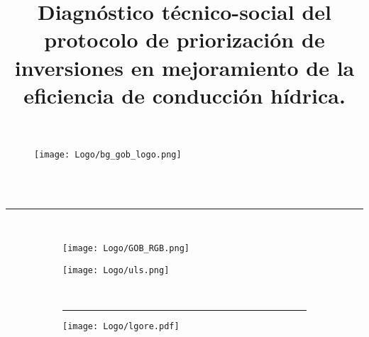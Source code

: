 \documentclass[]{article}
\title{Diagnóstico técnico-social del protocolo de priorización de inversiones en mejoramiento de la eficiencia de conducción hídrica.}
\author{}
\date{}
\begin{document}
\sloppy 


\begin{titlepage}

\begin{figure} [H]
  \texttt{[image: Logo/bg\_gob\_logo.png]}
\end{figure}

\fontsize{15}{0} \selectfont{\textbf{\textcolor{casinegro}{``PLANIFICACIÓN DE LA INVERSIÓN EN REVESTIMIENTOS HÍDRICOS"}}} \vspace*{.1in}\\ %
\fontsize{15}{0} \selectfont{\textcolor{casinegro}{FIC-R 2016}}\\
\rule{10cm}{.05cm}
\vspace*{.1in}
\hspace*{.2in}

\fontsize{14}{0} \selectfont{\textcolor{casinegro}{Universidad de La Serena}} \vspace*{.1in}\\
\fontsize{14}{0} \selectfont{\textbf{\textcolor{casinegro}{Región de Coquimbo}}}

\vspace*{.1in}

\begin{figure}[H]
  \centering
\begin{subfigure}[c]{.2\textwidth}
  \texttt{[image: Logo/GOB\_RGB.png]}
\end{subfigure}
\hfill
\begin{subfigure}[c]{.23\textwidth}
  \texttt{[image: Logo/uls.png]} 
\end{subfigure}
\end{figure}
\vspace*{4in}

\begin{figure}[H]
  \centering
\begin{subfigure}{.74\textwidth}
   \fontsize{14}{0} \selectfont{\textcolor{casinegro}{Abril 2018}} \\
   {\rule[-3mm]{10cm}{.05cm}}
\end{subfigure}
\hfill
\begin{subfigure}{.25\textwidth}
\hfill
  \texttt{[image: Logo/lgore.pdf]} 
\end{subfigure}
\end{figure}


\end{titlepage}
\end{document}
